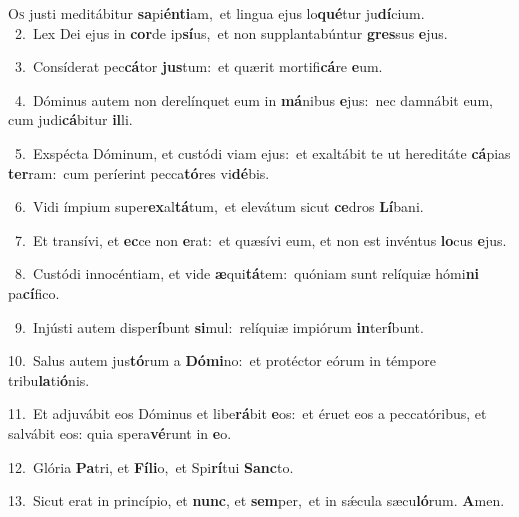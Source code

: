 \lettrine{\initial\textcolor{\initialcolor}{O}}{s} justi meditábitur \textbf{sa}\-pi\-\textbf{én}\-\textbf{ti}am,~\star et lingua ejus lo\-\textbf{qué}\-tur ju\-\textbf{dí}\-cium.\\
{\numbfont\textcolor{\numbcolor}{~2.}}~Lex Dei ejus in \textbf{cor}\-de ip\-\textbf{sí}\-us,~\star et non supplantabúntur \textbf{gres}\-sus \textbf{e}\-jus.\par
{\numbfont\textcolor{\numbcolor}{~3.}}~Consíderat pec\-\textbf{cá}\-tor \textbf{jus}\-tum:~\star et quærit mortifi\-\textbf{cá}\-re \textbf{e}\-um.\par
{\numbfont\textcolor{\numbcolor}{~4.}}~Dóminus autem non derelínquet eum in \textbf{má}\-nibus \textbf{e}\-jus:~\star nec damnábit eum, cum judi\-\textbf{cá}\-bitur \textbf{il}\-li.\par
{\numbfont\textcolor{\numbcolor}{~5.}}~Exspécta Dóminum, et custódi viam ejus:~\dagger et exaltábit te ut hereditáte \textbf{cá}\-pias \textbf{ter}\-ram:~\star cum períerint pecca\-\textbf{tó}\-res vi\-\textbf{dé}\-bis.\par
{\numbfont\textcolor{\numbcolor}{~6.}}~Vidi ímpium super\-\textbf{ex}\-al\-\textbf{tá}\-tum,~\star et elevátum sicut \textbf{ce}\-dros \textbf{Lí}\-bani.\par
{\numbfont\textcolor{\numbcolor}{~7.}}~Et transívi, et \textbf{ec}\-ce non \textbf{e}\-rat:~\star et quæsívi eum, et non est invéntus \textbf{lo}\-cus \textbf{e}\-jus.\par
{\numbfont\textcolor{\numbcolor}{~8.}}~Custódi innocéntiam, et vide \textbf{æ}\-qui\-\textbf{tá}\-tem:~\star quóniam sunt relíquiæ hómi\textbf{ni} pa\-\textbf{cí}\-fico.\par
{\numbfont\textcolor{\numbcolor}{~9.}}~Injústi autem disper\-\textbf{í}\-bunt \textbf{si}\-mul:~\star relíquiæ impiórum \textbf{in}\-ter\-\textbf{í}\-bunt.\par
{\numbfont\textcolor{\numbcolor}{10.}}~Salus autem jus\-\textbf{tó}\-rum a \textbf{Dó}\-\textbf{mi}no:~\star et protéctor eórum in témpore tribu\-\textbf{la}\-ti\-\textbf{ó}\-nis.\par
{\numbfont\textcolor{\numbcolor}{11.}}~Et adjuvábit eos Dóminus et libe\-\textbf{rá}\-bit \textbf{e}\-os:~\star et éruet eos a peccatóribus, et salvábit eos: quia spera\-\textbf{vé}\-runt in \textbf{e}\-o.\par
{\numbfont\textcolor{\numbcolor}{12.}}~Glória \textbf{Pa}\-tri, et \textbf{Fí}\-\textbf{li}o,~\star et Spi\-\textbf{rí}\-tui \textbf{Sanc}\-to.\par
{\numbfont\textcolor{\numbcolor}{13.}}~Sicut erat in princípio, et \textbf{nunc}\-, et \textbf{sem}\-per,~\star et in sǽcula sæcu\-\textbf{ló}\-rum. \textbf{A}\-men.\par
